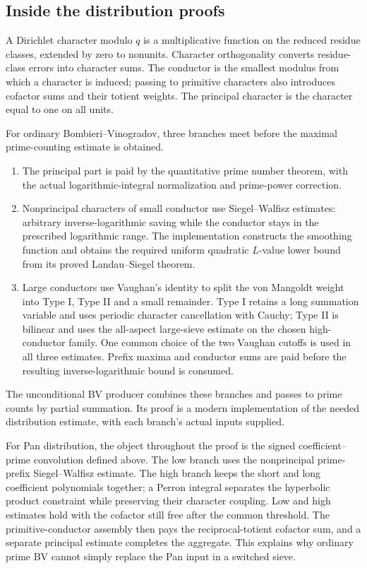 \subsection{Inside the distribution proofs}
A Dirichlet character modulo $q$ is a multiplicative function on the reduced
residue classes, extended by zero to nonunits. Character orthogonality
converts residue-class errors into character sums. The conductor is the
smallest modulus from which a character is induced; passing to primitive
characters also introduces cofactor sums and their totient weights.
The principal character is the character equal to one on all units.

For ordinary Bombieri--Vinogradov, three branches meet before the maximal
prime-counting estimate is obtained.
\begin{enumerate}
\item The principal part is paid by the quantitative prime number theorem,
with the actual logarithmic-integral normalization and prime-power correction.
\item Nonprincipal characters of small conductor use Siegel--Walfisz
estimates: arbitrary inverse-logarithmic saving while the conductor stays
in the prescribed logarithmic range. The implementation constructs the
smoothing function and obtains the required uniform quadratic $L$-value
lower bound from its proved Landau--Siegel theorem.
\item Large conductors use Vaughan's identity to split the von Mangoldt
weight into Type I, Type II and a small remainder. Type I retains a long
summation variable and uses periodic character cancellation with Cauchy;
Type II is bilinear and uses the all-aspect large-sieve estimate on the
chosen high-conductor family. One common choice of the two Vaughan
cutoffs is used in all three estimates. Prefix maxima and conductor
sums are paid before the resulting inverse-logarithmic bound is consumed.
\end{enumerate}
The unconditional BV producer combines these branches and passes to prime
counts by partial summation. Its proof is a modern implementation of the
needed distribution estimate, with each branch's actual inputs supplied.

For Pan distribution, the object throughout the proof is the signed
coefficient--prime convolution defined above. The low branch uses the
nonprincipal prime-prefix Siegel--Walfisz estimate. The high branch keeps
the short and long coefficient polynomials together; a Perron integral
separates the hyperbolic product constraint while preserving their
character coupling. Low and high estimates hold with the cofactor still
free after the common threshold. The primitive-conductor assembly then
pays the reciprocal-totient cofactor sum, and a separate principal estimate
completes the aggregate. This explains why ordinary prime BV cannot
simply replace the Pan input in a switched sieve.

